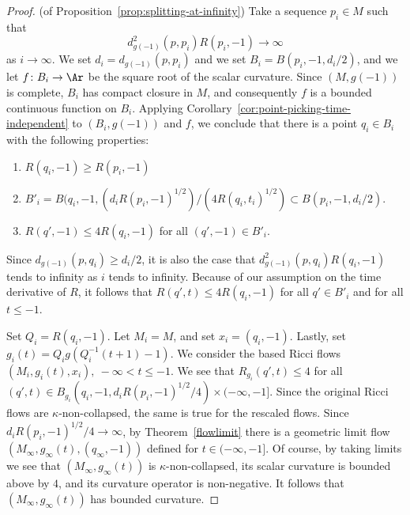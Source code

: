 \begin{proof} (of Proposition~\ref{prop:splitting-at-infinity})
Take a sequence $p_i\in M$ such that
$$d_{g(-1)}^2(p,p_i)R(p_i,-1)\rightarrow\infty$$ as $i\rightarrow \infty$.
  We set $d_i=d_{g(-1)}(p,p_i)$ and we set
$B_i=B(p_i,-1,d_i/2)$, and we let $f\colon B_i\to \Ar$ be the square
root of the scalar curvature. Since $(M,g(-1))$ is complete, $B_i$
has compact closure in $M$, and consequently $f$ is a bounded
continuous function on $B_i$. Applying Corollary~\ref{cor:point-picking-time-independent} to
$(B_i,g(-1))$ and $f$, we conclude that there is a point $q_i\in
B_i$ with the following properties:
\begin{enumerate}
\item[(1)] $R(q_i,-1)\ge R(p_i,-1)$
\item[(2)] $B'_i=B(q_i,-1,(d_iR(p_i,-1)^{1/2})/(4R(q_i,t_i)^{1/2})\subset B(p_i,-1,d_i/2)$.
\item[(3)] $R(q',-1)\le 4R(q_i,-1)$ for
all $(q',-1)\in B'_i$.
\end{enumerate}
Since $d_{g(-1)}(p,q_i)\ge d_i/2$, it is also the case that
$d^2_{g(-1)}(p,q_i)R(q_i,-1)$ tends to infinity as $i$ tends to infinity.
Because of our assumption on the time derivative of $R$, it follows that
$R(q',t)\le 4R(q_i,-1)$ for all $q'\in B'_i$ and for all $t\le -1$.




 Set
$Q_i=R(q_i,-1)$. Let $M_i=M$, and set $x_i=(q_i,-1)$. Lastly, set
$g_i(t)=Q_ig(Q_i^{-1}(t+1)-1)$. We consider the based Ricci flows
$(M_i,g_i(t),x_i),\ -\infty<t\le -1$. We see that $R_{g_i}(q',t)\le
4$ for all $(q',t)\in B_{g_i}(q_i,-1,d_iR(p_i,-1)^{1/2}/4)\times
(-\infty,-1]$. Since the original Ricci flows are
$\kappa$-non-collapsed, the same is true for the rescaled flows.
Since $d_iR(p_i,-1)^{1/2}/4\rightarrow \infty$, by
Theorem~\ref{flowlimit} there is a geometric limit flow
$(M_\infty,g_\infty(t),(q_\infty,-1))$ defined for $t\in
(-\infty,-1]$. Of course, by taking limits we see that
$(M_\infty,g_\infty(t))$ is $\kappa$-non-collapsed, its scalar
curvature is bounded above by $4$, and its curvature operator is
non-negative. It follows that $(M_\infty,g_\infty(t))$ has bounded
curvature.



\end{proof}
